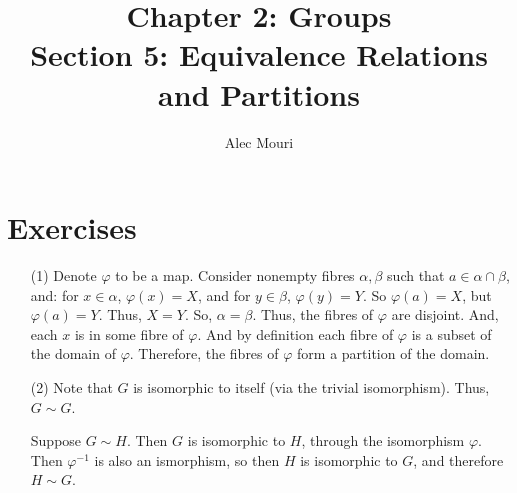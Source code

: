 \documentclass[12pt]{article}
\begin{document}
\title{Chapter 2: Groups \\ Section 5: Equivalence Relations and Partitions}
\author{Alec Mouri}

\maketitle
\section*{Exercises}
\begin{itemize}
\item[(1)]
Denote $\varphi$ to be a map. Consider nonempty fibres $\alpha, \beta$ such that $a \in \alpha \cap \beta$, and: for $x \in \alpha$, $\varphi(x) = X$, and for $y \in \beta$, $\varphi(y) = Y$. So $\varphi(a) = X$, but $\varphi(a) = Y$. Thus, $X = Y$. So, $\alpha = \beta$. Thus, the fibres of $\varphi$ are disjoint.
And, each $x$ is in some fibre of $\varphi$. And by definition each fibre of $\varphi$ is a subset of the domain of $\varphi$. Therefore, the fibres of $\varphi$ form a partition of the domain.
\item[(2)]
Note that $G$ is isomorphic to itself (via the trivial isomorphism). Thus, $G \sim G$.

Suppose $G \sim H$. Then $G$ is isomorphic to $H$, through the isomorphism $\varphi$. Then $\varphi^{-1}$ is also an ismorphism, so then $H$ is isomorphic to $G$, and therefore $H \sim G$.


\end{itemize}
\end{document}
